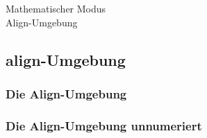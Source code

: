 \documentclass{beamer}
\begin{document}
\begin{frame}
 \begin{center}
  \Huge Mathematischer Modus \\
  \Large Align-Umgebung
 \end{center}
\end{frame}

\subsection{align-Umgebung}
\begin{frame}[fragile]
\frametitle{Die Align-Umgebung}
  \begin{semiverbatim}
  \end{semiverbatim}
\end{frame}

\begin{frame}[fragile]
\frametitle{Die Align-Umgebung unnumeriert}
 \begin{semiverbatim}
 \end{semiverbatim}
\end{frame}
\end{document}
